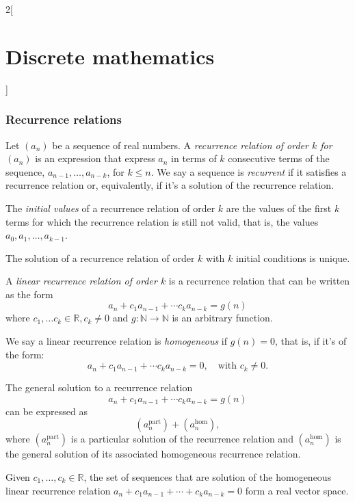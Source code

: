 \documentclass[../../../main.tex]{subfiles}
\begin{document}
\begin{multicols}{2}[\section{Discrete mathematics}]
\subsubsection*{Recurrence relations}
\begin{definition}
Let $(a_n)$ be a sequence of real numbers. A \textit{recurrence relation of order $k$ for $(a_n)$} is an expression that express $a_n$ in terms of $k$ consecutive terms of the sequence, $a_{n-1},\ldots,a_{n-k}$, for $k\leq n$. We say a sequence is \textit{recurrent} if it satisfies a recurrence relation or, equivalently, if it's a solution of the recurrence relation.
\end{definition}
\begin{definition}
The \textit{initial values} of a recurrence relation of order $k$ are the values of the first $k$ terms for which the recurrence relation is still not valid, that is, the values $a_0,a_1,\ldots,a_{k-1}$.
\end{definition}
\begin{lemma}
The solution of a recurrence relation of order $k$ with $k$ initial conditions is unique.
\end{lemma}
\begin{definition}
A \textit{linear recurrence relation of order $k$} is a recurrence relation that can be written as the form $$a_n+c_1a_{n-1}+\cdots c_ka_{n-k}=g(n)$$ where $c_1,\ldots c_k\in\mathbb{R}, c_k\ne 0$ and $g:\mathbb{N}\rightarrow\mathbb{N}$ is an arbitrary function.
\end{definition}
\begin{definition}
We say a linear recurrence relation is \textit{homogeneous} if $g(n)=0$, that is, if it's of the form: $$a_n+c_1a_{n-1}+\cdots c_ka_{n-k}=0,\quad\text{with }c_k\ne 0.$$
\end{definition}
\begin{prop}
The general solution to a recurrence relation $$a_n+c_1a_{n-1}+\cdots c_ka_{n-k}=g(n)$$ can be expressed as $$(a_n^\text{part})+(a_n^\text{hom}),$$ where $(a_n^\text{part})$ is a particular solution of the recurrence relation and $(a_n^\text{hom})$ is the general solution of its associated homogeneous recurrence relation.
\end{prop}
\begin{prop}
Given $c_1,\ldots,c_k\in\mathbb{R}$, the set of sequences that are solution of the homogeneous linear recurrence relation $a_n+c_1a_{n-1}+\cdots+c_ka_{n-k}=0$ form a real vector space.
\end{prop}
\begin{definition}

\end{definition}
\end{multicols}
\end{document}
